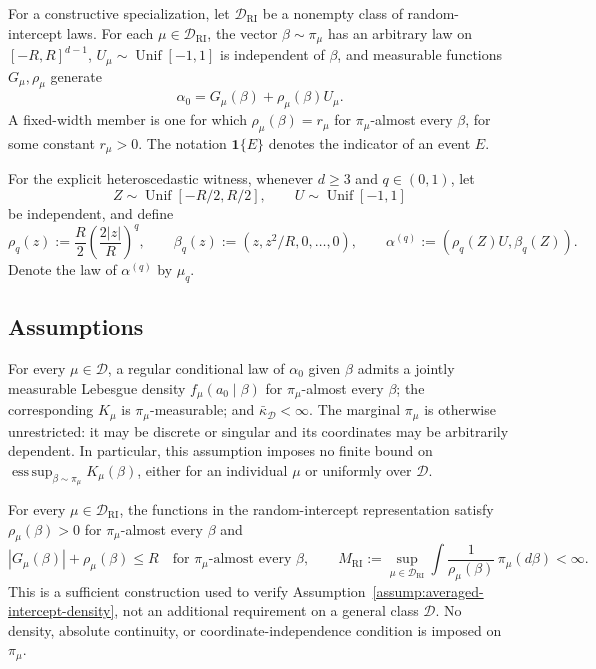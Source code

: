 For a constructive specialization, let $\mathcal D_{\mathrm{RI}}$ be a
nonempty class of random-intercept laws.  For each
$\mu\in\mathcal D_{\mathrm{RI}}$, the vector
$\beta\sim\pi_\mu$ has an arbitrary law on $[-R,R]^{d-1}$,
$U_\mu\sim\operatorname{Unif}[-1,1]$ is independent of $\beta$, and
measurable functions $G_\mu,\rho_\mu$ generate
\[
\alpha_0=G_\mu(\beta)+\rho_\mu(\beta)U_\mu.
\]
A fixed-width member is one for which
$\rho_\mu(\beta)=r_\mu$ for $\pi_\mu$-almost every $\beta$, for some
constant $r_\mu>0$.  The notation $\mathbf 1\{E\}$ denotes the indicator
of an event $E$.

For the explicit heteroscedastic witness, whenever $d\geq3$ and
$q\in(0,1)$, let
\[
Z\sim\operatorname{Unif}[-R/2,R/2],
\qquad U\sim\operatorname{Unif}[-1,1]
\]
be independent, and define
\[
\rho_q(z):=\frac R2\left(\frac{2|z|}{R}\right)^q,
\qquad
\beta_q(z):=(z,z^2/R,0,\ldots,0),
\qquad
\alpha^{(q)}:=(\rho_q(Z)U,\beta_q(Z)).
\]
Denote the law of $\alpha^{(q)}$ by $\mu_q$.

\subsection{Assumptions}

\begin{assumption}
\label{assump:averaged-intercept-density}
For every $\mu\in\mathcal D$, a regular conditional law of $\alpha_0$
given $\beta$ admits a jointly measurable Lebesgue density
$f_\mu(a_0\mid\beta)$ for $\pi_\mu$-almost every $\beta$; the
corresponding $K_\mu$ is $\pi_\mu$-measurable; and
$\bar\kappa_{\mathcal D}<\infty$.  The marginal $\pi_\mu$ is otherwise
unrestricted: it may be discrete or singular and its coordinates may be
arbitrarily dependent.  In particular, this assumption imposes no finite
bound on
$\operatorname*{ess\,sup}_{\beta\sim\pi_\mu}K_\mu(\beta)$, either for an
individual $\mu$ or uniformly over $\mathcal D$.
\end{assumption}

\begin{assumption}
\label{assump:random-intercept-witness}
For every $\mu\in\mathcal D_{\mathrm{RI}}$, the functions in the
random-intercept representation satisfy
$\rho_\mu(\beta)>0$ for $\pi_\mu$-almost every $\beta$ and
\[
|G_\mu(\beta)|+\rho_\mu(\beta)\leq R
\quad\text{for }\pi_\mu\text{-almost every }\beta,
\qquad
M_{\mathrm{RI}}
:=\sup_{\mu\in\mathcal D_{\mathrm{RI}}}
\int\frac{1}{\rho_\mu(\beta)}\,\pi_\mu(d\beta)<\infty.
\]
This is a sufficient construction used to verify
Assumption~\ref{assump:averaged-intercept-density}, not an additional
requirement on a general class $\mathcal D$.  No density, absolute
continuity, or coordinate-independence condition is imposed on
$\pi_\mu$.
\end{assumption}

